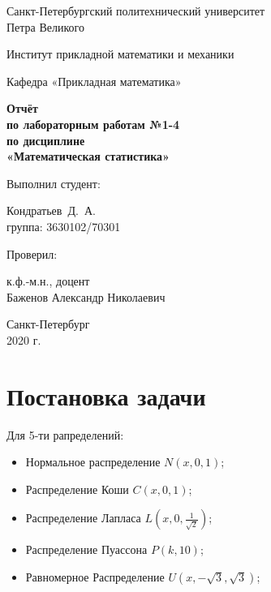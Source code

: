 \documentclass[12pt,a4paper]{article}
\begin{document}
	\begin{titlepage}
		\begin{center}			
			Санкт-Петербургский политехнический университет\\
			Петра Великого
			\vspace{0.25cm}
			
			Институт прикладной математики и механики
			
			Кафедра «Прикладная математика»
			\vfill
			
			\textbf{Отчёт\\
				по лабораторным работам №1-4\\
				по дисциплине\\
				«Математическая статистика»}\\[5mm]
			\bigskip
		\end{center}
		\vfill
		
		\hfill\begin{minipage}{0.45\textwidth}
			Выполнил студент:
			\vspace{0.2cm}
			
			Кондратьев~Д.~А.\\
			группа: 3630102/70301
		\end{minipage}%
		\bigskip
		
		\hfill\begin{minipage}{0.45\textwidth}
			Проверил:
			\vspace{0.2cm}
			
			к.ф.-м.н., доцент\\
			Баженов Александр Николаевич
		\end{minipage}%
		\vfill
		
		\begin{center}
			Санкт-Петербург\\
			2020 г.
		\end{center}
	\end{titlepage}
	
\tableofcontents{}
\newpage
\listoffigures
\listoftables
\newpage

\section{Постановка задачи}
	Для 5-ти рапределений:
	\begin{itemize}
		\item Нормальное распределение $N(x,0,1)$;
		\item Распределение Коши $C(x,0,1)$;
		\item Распределение Лапласа $L( x,0,\frac{1}{\sqrt{2}})$;
		\item Распределение Пуассона $P(k, 10)$;
		\item Равномерное Распределение $U(x,-\sqrt{3}, \sqrt{3})$;
	\end{itemize}
\end{document}
